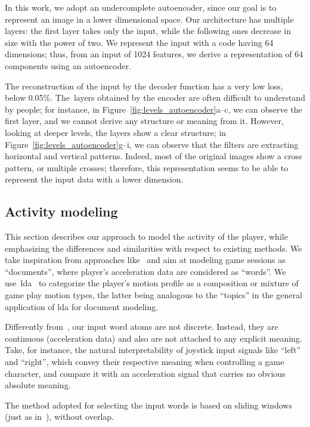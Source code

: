In this work, we adopt an undercomplete autoencoder, since our goal is to represent an image in a lower dimensional space. 
Our architecture has multiple layers: the first layer takes only the input, while the following ones decrease in size with the power of two.
We represent the input with a code having 64 dimensions; thus, from an input of 1024 features, we derive a representation of 64 components using an autoencoder.

The reconstruction of the input by the decoder function has a very low loss, below 0.05\%. The~layers obtained by the encoder are often difficult to understand by people; for instance, in Figure~\ref{fig:levels_autoencoder}a--c, we can observe the first layer, and we cannot derive any structure or meaning from it. However, looking at deeper levels, the layers show a clear structure; in Figure~\ref{fig:levels_autoencoder}g--i, we can observe that the filters are extracting horizontal and vertical patterns. Indeed, most of the original images show a cross pattern, or multiple crosses; therefore, this representation seems to be able to represent the input data with a lower dimension.

\subsection{Activity modeling}
This section describes our approach to model the activity of the player, while emphasizing the differences and similarities with respect to existing methods. We take inspiration from approaches like~\cite{smith_mining_2016, wang_encoding_2015, wang_imaging_2015} and aim at modeling game sessions as ``documents'', where player's acceleration data are considered as ``words''. We use~\gls{lda}~\cite{blei_latent_2003} to categorize the player's motion profile as a composition or mixture of game play motion types, the latter being analogous to the ``topics'' in the general application of \gls{lda} for document modeling.

Differently from~\cite{smith_mining_2016}, our input word atoms are not discrete. Instead, they are continuous (acceleration data) and also are not attached to any explicit meaning. Take, for instance, the natural interpretability of joystick input signals like ``left'' and ``right'', which convey their respective meaning when controlling a game character, and compare it with an acceleration signal that carries no obvious absolute meaning.

The method adopted for selecting the input words is based on sliding windows (just as in~\cite{smith_mining_2016}), without overlap. %


